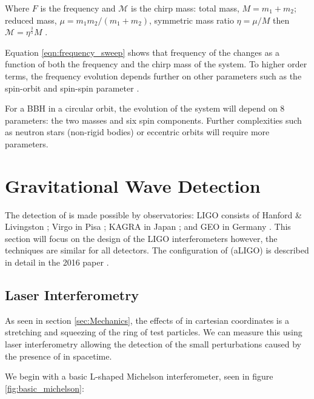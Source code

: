 Where $F$ is the \gw frequency and $\mathcal{M}$ is the chirp mass: total mass, $M = m_1 + m_2$; reduced mass, $\mu = m_1 m_2/(m_1+m_2)$, symmetric mass ratio $\eta = \mu/M$ then $\mathcal{M} = \eta^\frac{3}{5} M$ \cite{PE:1995}.

Equation \ref{eqn:frequency_sweep} shows that frequency of the \gw changes as a function of both the frequency and the chirp mass of the system. To higher order terms, the frequency evolution depends further on other parameters such as the spin-orbit and spin-spin parameter \cite{CBC_spin:1993}.

For a BBH in a circular orbit, the evolution of the system will depend on 8 parameters: the two masses and six spin components. Further complexities such as neutron stars (non-rigid bodies) or eccentric orbits will require more parameters.

\section{\label{sec:IFOs}Gravitational Wave Detection}

The detection of \gws is made possible by \gw observatories: LIGO consists of Hanford \& Livingston \cite{aLIGO:2015}; Virgo in Pisa \cite{aVirgo:2015}; KAGRA in Japan \cite{KAGRA:2021}; and GEO in Germany \cite{GEO600:2002}. This section will focus on
the design of the LIGO interferometers however, the techniques are similar for all detectors. The configuration of \aligo (aLIGO) is described in detail in the 2016 paper \cite{aLIGO:2015}.

\subsection{\label{sec:laser_interferometry}Laser Interferometry}

As seen in section \ref{sec:Mechanics}, the effects of \gws in cartesian coordinates is a stretching and squeezing of the ring of test particles. We can measure this using laser interferometry allowing the detection of the small
perturbations caused by the presence of \gws in spacetime.

We begin with a basic L-shaped Michelson interferometer, seen in figure \ref{fig:basic_michelson}:

